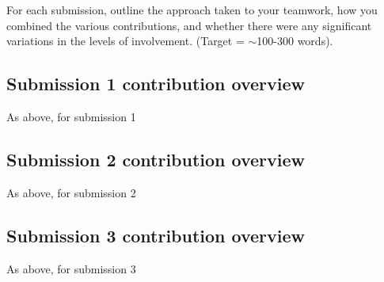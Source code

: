 \documentclass[a4paper, 11pt]{report}
\begin{document}
For each submission, outline the approach taken to your teamwork, how you combined the various contributions, and whether there were any significant variations in the levels of involvement. (Target = $\sim$100-300 words).

\subsection{Submission 1 contribution overview}

As above, for submission 1

\subsection{Submission 2 contribution overview}

As above, for submission 2

\subsection{Submission 3 contribution overview}

As above, for submission 3



\newpage



\end{document}
